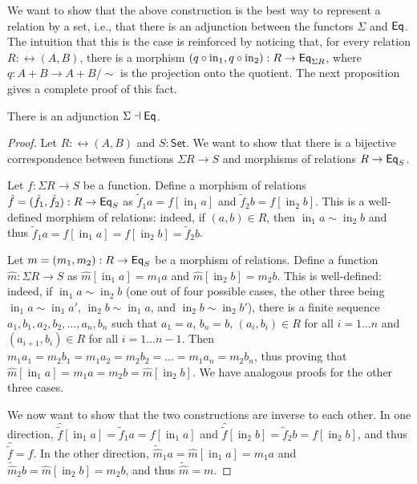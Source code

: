 \documentclass{lmcs}
\theoremstyle{plain}\newtheorem{satz}[thm]{Satz}
\newcommand{\set}{\mathsf{Set}}
\DeclareMathOperator{\SumIn}{in}
\begin{document}
We want to show that the above construction is the best way to represent a relation by a set, i.e., that there is an adjunction between the functors $\Sigma$ and $\mathsf{Eq}$.
The intuition that this is the case is reinforced by noticing that, for every relation $R : \rel(A, B)$, there is a morphism $(q \circ \SumIn_1, q \circ \SumIn_2) : R \to \Eq_{\Sigma{R}}$, where $q : A + B \to A + B/\sim$ is the projection onto the quotient.
The next proposition gives a complete proof of this fact.

\begin{prop}
There is an adjunction $\Sigma \dashv \mathsf{Eq}$.
\end{prop}
\begin{proof}
Let $R : \rel(A, B)$ and $S: \set$.
We want to show that there is a bijective correspondence between functions $\Sigma{R} \to S$ and morphisms of relations $R \to \mathsf{Eq}_S$.

Let $f : \Sigma{R} \to S$ be a function.
Define a morphism of relations $\tilde{f} = (\tilde{f}_1, \tilde{f}_2) : R \to \mathsf{Eq}_S$ as $\tilde{f}_1 a = f [ \SumIn_1 a ]$ and $\tilde{f}_2 b = f [ \SumIn_2 b ]$.
This is a well-defined morphism of relations: indeed, if $(a, b) \in R$, then $\SumIn_1 a \sim \SumIn_2 b$ and thus $\tilde{f}_1 a = f [ \SumIn_1 a ] = f [ \SumIn_2 b ] = \tilde{f}_2 b$.

Let $m = (m_1, m_2) : R \to \mathsf{Eq}_S$ be a morphism of relations.
Define a function $\hat{m} : \Sigma{R} \to S$ as $\hat{m} [ \SumIn_1 a ] = m_1 a$ and $\hat{m} [ \SumIn_2 b ] = m_2 b$.
This is well-defined: indeed, if $\SumIn_1 a \sim \SumIn_2 b$ (one out of four possible cases, the other three being $\SumIn_1 a \sim \SumIn_1 a'$, $\SumIn_2 b \sim \SumIn_1 a$, and $\SumIn_2 b \sim \SumIn_2 b'$), there is a finite sequence $a_1, b_1, a_2, b_2, \dots, a_n, b_n$ such that $a_1 = a$, $b_n = b$, $(a_i, b_i) \in R$ for all $i = 1 \dots n$ and $(a_{i + 1}, b_{i}) \in R$ for all $i = 1 \dots n - 1$.
Then $m_1 a_1 = m_2 b_1 = m_1 a_2 = m_2 b_2 = \dots = m_1 a_n = m_2 b_n$, thus proving that $\hat{m}[\SumIn_1 a] = m_1 a = m_2 b = \hat{m}[\SumIn_2 b]$.
We have analogous proofs for the other three cases.

We now want to show that the two constructions are inverse to each other.
In one direction, $\hat{\tilde{f}} [\SumIn_1 a] = \tilde{f}_1 a = f [\SumIn_1 a]$ and $\hat{\tilde{f}} [\SumIn_2 b] = \tilde{f}_2 b = f [\SumIn_2 b]$, and thus $\hat{\tilde{f}} = f$.
In the other direction, $\tilde{\hat{m}}_1 a = \hat{m} [\SumIn_1 a] = m_1 a$ and $\tilde{\hat{m}}_2 b = \hat{m} [\SumIn_2 b] = m_2 b$, and thus $\tilde{\hat{m}} = m$.
\end{proof}
\end{document}
